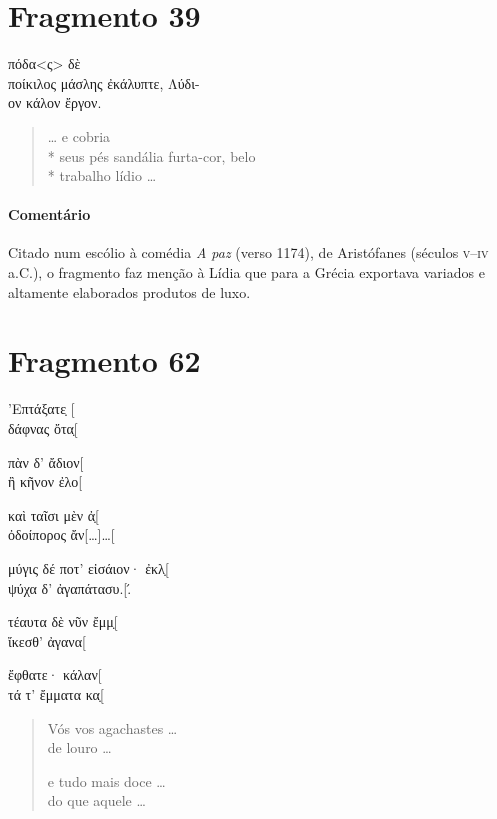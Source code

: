 {\section{Fragmento 39}

\begin{gkverse}
πόδα<ς> δὲ\\
ποίκιλος μάσλης ἐκάλυπτε, Λύδι-\\
ον κάλον ἔργον.
\end{gkverse}

\begin{verse}
\ldots{} e cobria\\*
seus pés sandália furta-cor, belo\\*
trabalho lídio \ldots{}
\end{verse}

{\paragraph{Comentário} Citado num escólio à comédia \textit{A paz} (verso 1174), de Aristófanes (séculos \textsc{v}--\textsc{iv} a.C.),
o fragmento faz menção à Lídia que para a Grécia exportava variados e altamente
elaborados produtos de luxo.}


\pagebreak
\section{Fragmento 62}

\begin{gkverse}
’Επτάξατε̣ [\\
δάφνας ὄτα̣[

πὰν δ’ ἄδιον[\\
ἢ κῆνον ἐλο[

καὶ ταῖσι μὲν ἀ̣[\\
ὀδοίπορος ἄν[\ldots{}]\ldots{}[

μύγις δέ ποτ’ εἰσάιον· ἐκλ̣[\\
ψύχα δ’ ἀγαπάτασυ.[.́

τέαυτα δὲ νῦν ἔμμ̣[\\
ἴκεσθ’ ἀγανα[

ἔφθατε· κάλαν[\\
τά τ’ ἔμματα κα̣[
\end{gkverse}

\begin{verse}
Vós vos agachastes \ldots{}\\
de louro \ldots{}

e tudo mais doce \ldots{}\\
do que aquele \ldots{}


\end{verse}}

